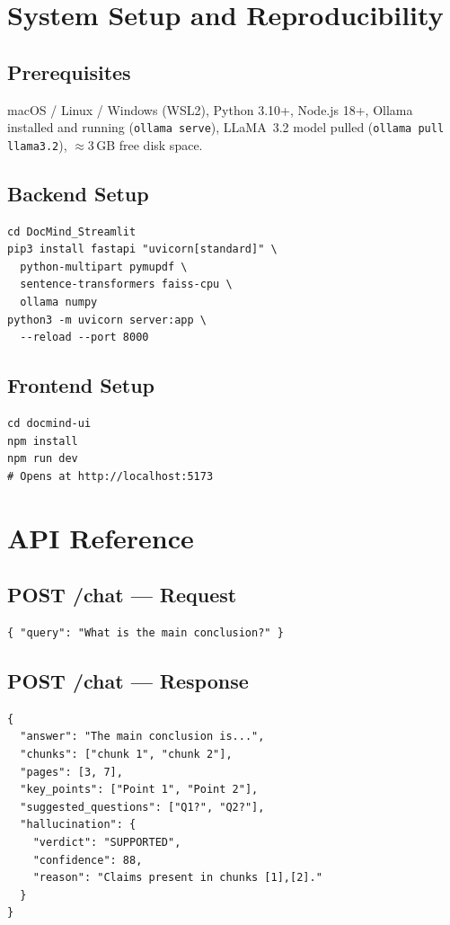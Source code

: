 \documentclass[conference]{IEEEtran}
\begin{document}
\appendix

\section{System Setup and Reproducibility}

\subsection{Prerequisites}
macOS / Linux / Windows (WSL2), Python 3.10+, Node.js 18+,
Ollama installed and running (\texttt{ollama serve}),
LLaMA~3.2 model pulled (\texttt{ollama pull llama3.2}),
$\approx$3\,GB free disk space.

\subsection{Backend Setup}
\begin{verbatim}
cd DocMind_Streamlit
pip3 install fastapi "uvicorn[standard]" \
  python-multipart pymupdf \
  sentence-transformers faiss-cpu \
  ollama numpy
python3 -m uvicorn server:app \
  --reload --port 8000
\end{verbatim}

\subsection{Frontend Setup}
\begin{verbatim}
cd docmind-ui
npm install
npm run dev
# Opens at http://localhost:5173
\end{verbatim}

\section{API Reference}

\subsection{POST /chat --- Request}
\begin{verbatim}
{ "query": "What is the main conclusion?" }
\end{verbatim}

\subsection{POST /chat --- Response}
\begin{verbatim}
{
  "answer": "The main conclusion is...",
  "chunks": ["chunk 1", "chunk 2"],
  "pages": [3, 7],
  "key_points": ["Point 1", "Point 2"],
  "suggested_questions": ["Q1?", "Q2?"],
  "hallucination": {
    "verdict": "SUPPORTED",
    "confidence": 88,
    "reason": "Claims present in chunks [1],[2]."
  }
}
\end{verbatim}
\end{document}
